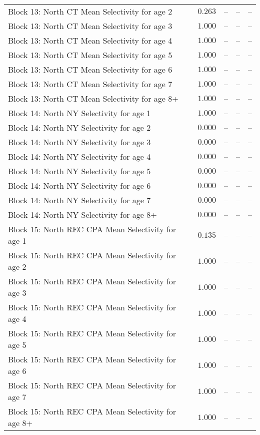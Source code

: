 \documentclass[
]{article}
\begin{document}
\begin{landscape}
\begin{longtable}[t]{lrrrr}
Block 13: North CT Mean Selectivity for age 2 & $0.263$ & -- & -- & --\\
\addlinespace
Block 13: North CT Mean Selectivity for age 3 & $1.000$ & -- & -- & --\\
Block 13: North CT Mean Selectivity for age 4 & $1.000$ & -- & -- & --\\
Block 13: North CT Mean Selectivity for age 5 & $1.000$ & -- & -- & --\\
Block 13: North CT Mean Selectivity for age 6 & $1.000$ & -- & -- & --\\
Block 13: North CT Mean Selectivity for age 7 & $1.000$ & -- & -- & --\\
\addlinespace
Block 13: North CT Mean Selectivity for age 8+ & $1.000$ & -- & -- & --\\
Block 14: North NY Selectivity for age 1 & $1.000$ & -- & -- & --\\
Block 14: North NY Selectivity for age 2 & $0.000$ & -- & -- & --\\
Block 14: North NY Selectivity for age 3 & $0.000$ & -- & -- & --\\
Block 14: North NY Selectivity for age 4 & $0.000$ & -- & -- & --\\
\addlinespace
Block 14: North NY Selectivity for age 5 & $0.000$ & -- & -- & --\\
Block 14: North NY Selectivity for age 6 & $0.000$ & -- & -- & --\\
Block 14: North NY Selectivity for age 7 & $0.000$ & -- & -- & --\\
Block 14: North NY Selectivity for age 8+ & $0.000$ & -- & -- & --\\
Block 15: North REC CPA Mean Selectivity for age 1 & $0.135$ & -- & -- & --\\
\addlinespace
Block 15: North REC CPA Mean Selectivity for age 2 & $1.000$ & -- & -- & --\\
Block 15: North REC CPA Mean Selectivity for age 3 & $1.000$ & -- & -- & --\\
Block 15: North REC CPA Mean Selectivity for age 4 & $1.000$ & -- & -- & --\\
Block 15: North REC CPA Mean Selectivity for age 5 & $1.000$ & -- & -- & --\\
Block 15: North REC CPA Mean Selectivity for age 6 & $1.000$ & -- & -- & --\\
\addlinespace
Block 15: North REC CPA Mean Selectivity for age 7 & $1.000$ & -- & -- & --\\
Block 15: North REC CPA Mean Selectivity for age 8+ & $1.000$ & -- & -- & --\\

\end{longtable}
\end{landscape}
\end{document}
